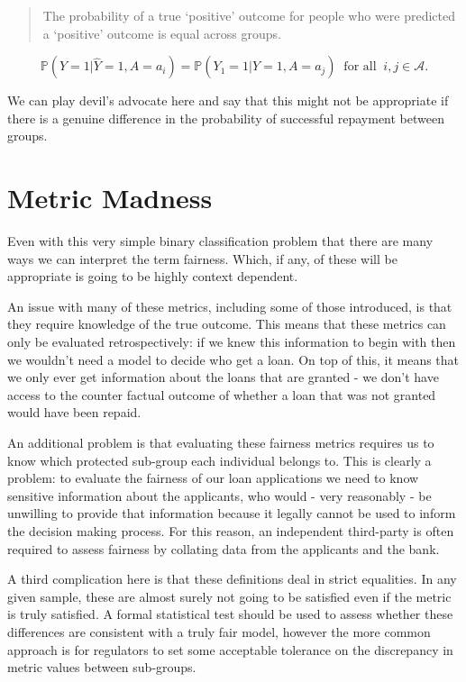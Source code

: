 \documentclass[
  letterpaper,
  DIV=11,
  numbers=noendperiod]{scrreprt}
\begin{document}
\begin{quote}
The probability of a true `positive' outcome for people who were
predicted a `positive' outcome is equal across groups.
\end{quote}

\[\mathbb{P}(Y = 1 | \hat Y = 1, A = a_i) = \mathbb{P}(Y_1 = 1 | \hat Y = 1, A = a_j) \ \text{ for all } \  i,j \in \mathcal{A}.\]

We can play devil's advocate here and say that this might not be
appropriate if there is a genuine difference in the probability of
successful repayment between groups.

\section{Metric Madness}\label{metric-madness}

Even with this very simple binary classification problem that there are
many ways we can interpret the term fairness. Which, if any, of these
will be appropriate is going to be highly context dependent.

An issue with many of these metrics, including some of those introduced,
is that they require knowledge of the true outcome. This means that
these metrics can only be evaluated retrospectively: if we knew this
information to begin with then we wouldn't need a model to decide who
get a loan. On top of this, it means that we only ever get information
about the loans that are granted - we don't have access to the counter
factual outcome of whether a loan that was not granted would have been
repaid.

An additional problem is that evaluating these fairness metrics requires
us to know which protected sub-group each individual belongs to. This is
clearly a problem: to evaluate the fairness of our loan applications we
need to know sensitive information about the applicants, who would -
very reasonably - be unwilling to provide that information because it
legally cannot be used to inform the decision making process. For this
reason, an independent third-party is often required to assess fairness
by collating data from the applicants and the bank.

A third complication here is that these definitions deal in strict
equalities. In any given sample, these are almost surely not going to be
satisfied even if the metric is truly satisfied. A formal statistical
test should be used to assess whether these differences are consistent
with a truly fair model, however the more common approach is for
regulators to set some acceptable tolerance on the discrepancy in metric
values between sub-groups.
\end{document}
